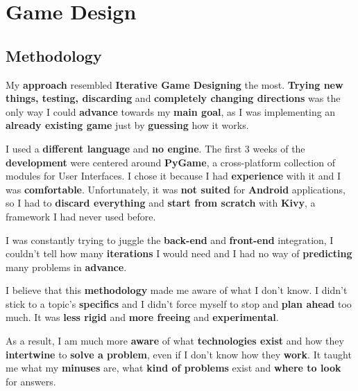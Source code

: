 \chapter{Game Design} 
	\section{Methodology}
		\par My \textbf{approach} resembled \textbf{Iterative Game Designing} the most. \textbf{Trying new things, testing, discarding} and \textbf{completely changing directions} was the only way I could \textbf{advance} towards my \textbf{main goal}, as I was implementing an \textbf{already existing game} just by \textbf{guessing} how it works.
		\par I used a \textbf{different language} and \textbf{no engine}. The first 3 weeks of the \textbf{development} were centered around \textbf{PyGame}, a cross-platform collection of modules for User Interfaces. I chose it because I had \textbf{experience} with it and I was \textbf{comfortable}. Unfortunately, it was \textbf{not suited} for \textbf{Android} applications, so I had to \textbf{discard everything} and \textbf{start from scratch} with \textbf{Kivy}, a framework I had never used before.
	      \par I was constantly trying to juggle the \textbf{back-end} and \textbf{front-end} integration, I couldn't tell how many \textbf{iterations} I would need and I had no way of \textbf{predicting} many problems in \textbf{advance}. 
		\par I believe that this \textbf{methodology} made me aware of what I don't know. I didn't stick to a topic's \textbf{specifics} and I didn't force myself to stop and \textbf{plan ahead} too much. It was \textbf{less rigid} and \textbf{more freeing} and \textbf{experimental}.
		\par As a result, I am much more \textbf{aware} of what \textbf{technologies exist} and how they \textbf{intertwine} to \textbf{solve a problem}, even if I don't know how they \textbf{work}. It taught me what my \textbf{minuses} are, what \textbf{kind of problems} exist and \textbf{where to look} for answers.  \\

		\begin{figure}[H]
			\centering
		\end{figure}
